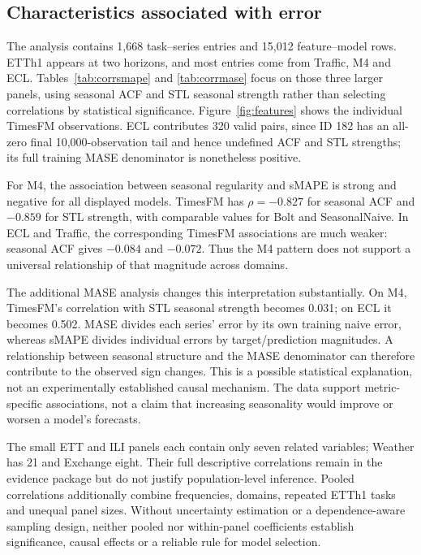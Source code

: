 \subsection{Characteristics associated with error}\label{sec:correlations}
The analysis contains 1,668 task--series entries and 15,012 feature--model rows. ETTh1 appears at two horizons, and most entries come from Traffic, M4 and ECL. Tables~\ref{tab:corrsmape} and \ref{tab:corrmase} focus on those three larger panels, using seasonal ACF and STL seasonal strength rather than selecting correlations by statistical significance. Figure~\ref{fig:features} shows the individual TimesFM observations. ECL contributes 320 valid pairs, since ID 182 has an all-zero final 10,000-observation tail and hence undefined ACF and STL strengths; its full training MASE denominator is nonetheless positive.




For M4, the association between seasonal regularity and sMAPE is strong and negative for all displayed models. TimesFM has $\rho=-0.827$ for seasonal ACF and $-0.859$ for STL strength, with comparable values for Bolt and SeasonalNaive. In ECL and Traffic, the corresponding TimesFM associations are much weaker: seasonal ACF gives $-0.084$ and $-0.072$. Thus the M4 pattern does not support a universal relationship of that magnitude across domains.

The additional MASE analysis changes this interpretation substantially. On M4, TimesFM's correlation with STL seasonal strength becomes 0.031; on ECL it becomes 0.502. MASE divides each series' error by its own training naive error, whereas sMAPE divides individual errors by target/prediction magnitudes. A relationship between seasonal structure and the MASE denominator can therefore contribute to the observed sign changes. This is a possible statistical explanation, not an experimentally established causal mechanism. The data support metric-specific associations, not a claim that increasing seasonality would improve or worsen a model's forecasts.

The small ETT and ILI panels each contain only seven related variables; Weather has 21 and Exchange eight. Their full descriptive correlations remain in the evidence package but do not justify population-level inference. Pooled correlations additionally combine frequencies, domains, repeated ETTh1 tasks and unequal panel sizes. Without uncertainty estimation or a dependence-aware sampling design, neither pooled nor within-panel coefficients establish significance, causal effects or a reliable rule for model selection.

